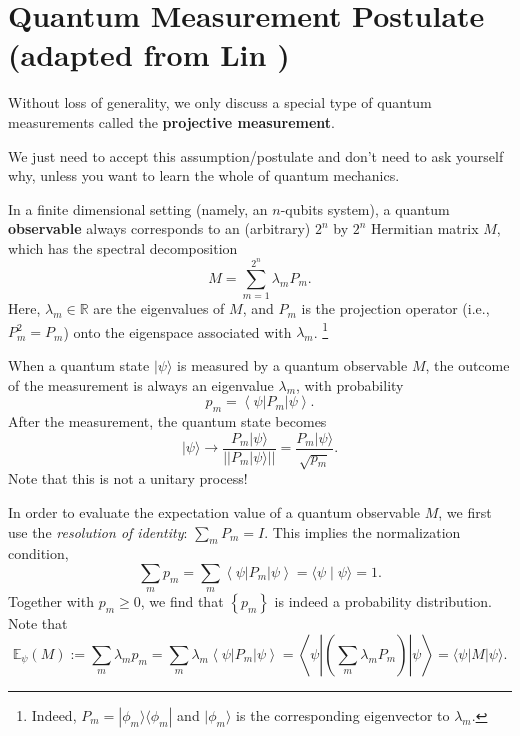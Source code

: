 \documentclass[
        11pt, %
	a4paper, %
]{LegrandOrangeBook}
\begin{document}
\newpage

\section{Quantum Measurement Postulate (adapted from Lin \cite{lin2022lecture}) }

Without loss of generality, we only discuss a special type of quantum measurements called the \textbf{projective measurement}. 

\begin{remark}
    We just need to accept this assumption/postulate and don't need to ask yourself why, unless you want to learn the whole of quantum mechanics.
\end{remark}

\begin{theorem}
In a finite dimensional setting (namely, an $n$-qubits system), a quantum \textbf{observable} always corresponds to an (arbitrary) $2^n$ by $2^n$ Hermitian matrix $M$, which has the spectral decomposition
\begin{equation}
    M=\sum_{m=1}^{2^n} \lambda_m P_m .
\end{equation}
Here, $\lambda_m \in \mathbb{R}$ are the eigenvalues of $M$, and $P_m$ is the projection operator (i.e., $P_m^2=P_m$) onto the eigenspace associated with $\lambda_m$. \footnote{Indeed, $P_m= | \phi_m\rangle \langle\phi_m| $ and $| \phi_m\rangle$ is the corresponding eigenvector to $\lambda_m$.}

When a quantum state $|\psi\rangle$ is measured by a quantum observable $M$, the outcome of the measurement is always an eigenvalue $\lambda_m$, with probability
\begin{equation}
    p_m=\left\langle\psi\left|P_m\right| \psi\right\rangle.
\end{equation}
After the measurement, the quantum state becomes
\begin{equation}
    |\psi\rangle \rightarrow \frac{P_m|\psi\rangle}{||P_m|\psi\rangle||}=\frac{P_m|\psi\rangle}{\sqrt{p_m}} .
\end{equation}
Note that this is not a unitary process!
\end{theorem}

In order to evaluate the expectation value of a quantum observable $M$, we first use the \textit{resolution of identity}: $\sum_m P_m=I$. This implies the normalization condition,
\begin{equation}
    \sum_m p_m=\sum_m\left\langle\psi\left|P_m\right| \psi\right\rangle=\langle\psi \mid \psi\rangle=1.
\end{equation}
Together with $p_m \geq 0$, we find that $\left\{p_m\right\}$ is indeed a probability distribution. Note that
\begin{equation}
    \mathbb{E}_\psi(M):=\sum_m \lambda_m p_m=\sum_m \lambda_m\left\langle\psi\left|P_m\right| \psi\right\rangle=\left\langle\psi\left|\left(\sum_m \lambda_m P_m\right)\right| \psi\right\rangle=\langle\psi|M| \psi\rangle.
\end{equation}
\end{document}
